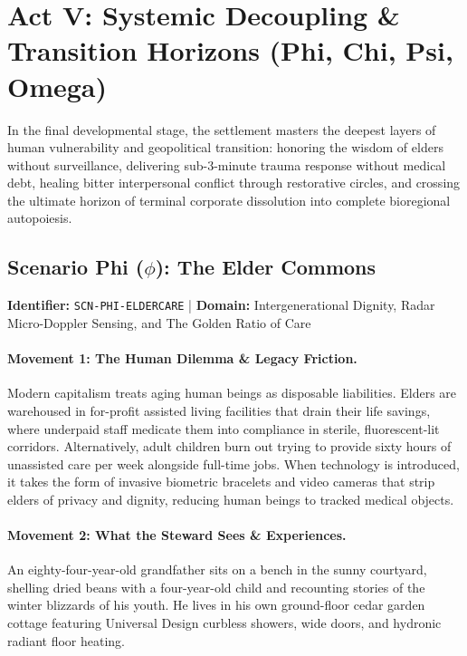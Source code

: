 \section{Act V: Systemic Decoupling \& Transition Horizons (Phi, Chi, Psi, Omega)}
\label{sec:act_5_shocks}

In the final developmental stage, the settlement masters the deepest layers of human vulnerability and geopolitical transition: honoring the wisdom of elders without surveillance, delivering sub-3-minute trauma response without medical debt, healing bitter interpersonal conflict through restorative circles, and crossing the ultimate horizon of terminal corporate dissolution into complete bioregional autopoiesis.

\subsection{Scenario Phi (\texorpdfstring{$\phi$}{Phi}): The Elder Commons}
\label{subsec:scn_phi}
\textbf{Identifier:} \texttt{SCN-PHI-ELDERCARE} \quad | \quad \textbf{Domain:} Intergenerational Dignity, Radar Micro-Doppler Sensing, and The Golden Ratio of Care

\paragraph{Movement 1: The Human Dilemma \& Legacy Friction.}
Modern capitalism treats aging human beings as disposable liabilities. Elders are warehoused in for-profit assisted living facilities that drain their life savings, where underpaid staff medicate them into compliance in sterile, fluorescent-lit corridors. Alternatively, adult children burn out trying to provide sixty hours of unassisted care per week alongside full-time jobs. When technology is introduced, it takes the form of invasive biometric bracelets and video cameras that strip elders of privacy and dignity, reducing human beings to tracked medical objects.

\paragraph{Movement 2: What the Steward Sees \& Experiences.}
An eighty-four-year-old grandfather sits on a bench in the sunny courtyard, shelling dried beans with a four-year-old child and recounting stories of the winter blizzards of his youth. He lives in his own ground-floor cedar garden cottage featuring Universal Design curbless showers, wide doors, and hydronic radiant floor heating. 

